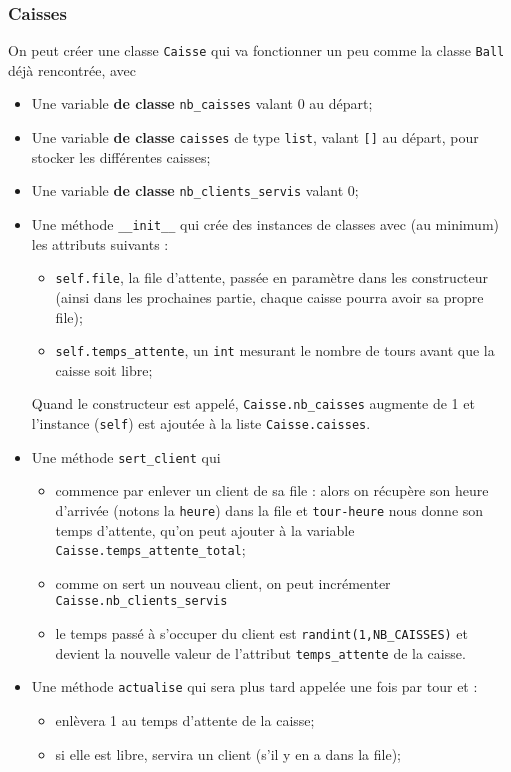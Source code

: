 \documentclass[12pt,firamath,article]{nsi}
\begin{document}
\subsubsection*{Caisses}
On peut créer une classe \texttt{Caisse} qui va fonctionner un peu comme la classe \texttt{Ball} déjà rencontrée, avec
\begin{itemize}
\item Une variable \textbf{de classe} \texttt{nb\_caisses} valant 0 au départ;
\item Une variable \textbf{de classe} \texttt{caisses} de type \texttt{list}, valant \texttt{[]} au départ, pour stocker les différentes caisses;
\item Une variable \textbf{de classe} \texttt{nb\_clients\_servis} valant 0;
\item Une méthode \texttt{__init__} qui crée des instances de classes avec (au minimum) les attributs suivants :
\begin{itemize}
    \item \texttt{self.file}, la file d'attente, passée en paramètre dans les constructeur (ainsi dans les prochaines partie, chaque caisse pourra avoir sa propre file);
    \item \texttt{self.temps_attente}, un \texttt{int} mesurant le nombre de tours avant que la caisse soit libre;
\end{itemize}
Quand le constructeur est appelé, \texttt{Caisse.nb_caisses} augmente de 1 et l'instance (\texttt{self}) est ajoutée à la liste \texttt{Caisse.caisses}.
\item Une méthode \texttt{sert_client} qui
\begin{itemize}
    \item commence par enlever un client de sa file : alors on récupère son heure d'arrivée (notons la \texttt{heure}) dans la file et \texttt{tour-heure} nous donne son temps d'attente, qu'on peut ajouter à la variable \texttt{Caisse.temps_attente_total};
    \item  comme on sert un nouveau client, on peut incrémenter \texttt{Caisse.nb_clients_servis}
    \item  le temps passé à s'occuper du client est \texttt{randint(1,NB_CAISSES)} et devient la nouvelle valeur de l'attribut \texttt{temps_attente} de la caisse.
\end{itemize}
\item Une méthode \texttt{actualise} qui sera plus tard appelée une fois par tour et :
    \begin{itemize}
        \item enlèvera 1 au temps d'attente de la caisse;
        \item si elle est libre, servira un client (s'il y en a dans la file);
    \end{itemize}

\end{itemize}
\end{document}
